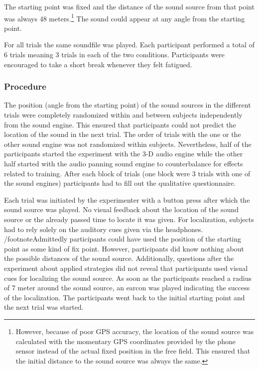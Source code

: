 \documentclass[journal]{IEEEtran}
\begin{document}
The starting point was fixed and the distance of the sound source from that point was always 48 meters.\footnote{However, because of poor GPS accuracy, the location of the sound source was calculated with the momentary GPS coordinates provided by the phone sensor instead of the actual fixed position in the free field. This ensured that the initial distance to the sound source was always the same.} The sound could appear at any angle from the starting point.

For all trials the same soundfile was played. Each participant performed a total of 6 trials meaning 3 trials in each of the two conditions. Participants were encouraged to take a short break whenever they felt fatigued.

\subsubsection{Procedure}
The position (angle from the starting point) of the sound sources in the different trials were completely randomized within and between subjects independently from the sound engine. This ensured that participants could not predict the location of the sound in the next trial. The order of trials with the one or the other sound engine was not randomized within subjects. Nevertheless, half of the participants started the experiment with the 3-D audio engine while the other half started with the audio panning sound engine to counterbalance for effects related to training. After each block of trials (one block were 3 trials with one of the sound engines) participants had to fill out the qualitative questionnaire.

Each trial was initiated by the experimenter with a button press after which the sound source was played. No visual feedback about the location of the sound source or the already passed time to locate it was given. For localization, subjects had to rely solely on the auditory cues given via the headphones. /footnote{Admittedly participants could have used the position of the starting point as some kind of fix point. However, participants did know nothing about the possible distances of the sound source. Additionally, questions after the experiment about applied strategies did not reveal that participants used visual cues for localizing the sound source.} As soon as the participants reached a radius of 7 meter around the sound source, an earcon was played indicating the success of the localization. The participants went back to the initial starting point and the next trial was started.
\end{document}
